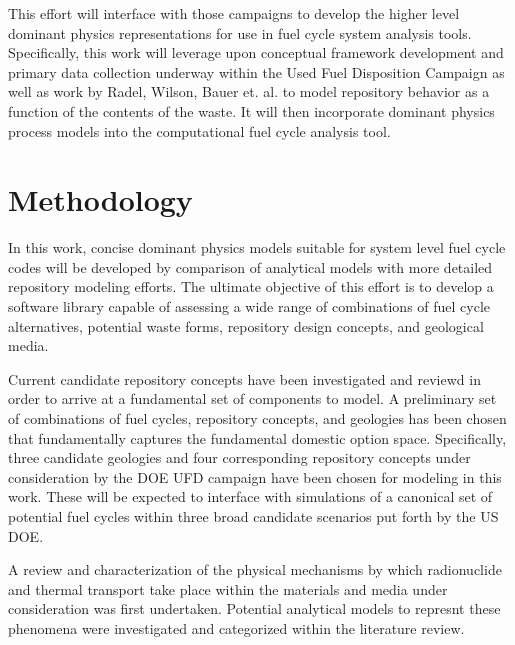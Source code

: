 This effort will interface with those campaigns to develop the higher level
dominant physics representations for use in fuel cycle system analysis tools.
Specifically, this work will leverage upon conceptual framework development and
primary data collection underway within the Used Fuel Disposition Campaign as
well as work by Radel, Wilson, Bauer et. al. to model repository behavior as a
function of the contents of the waste.  It will then incorporate dominant
physics process models into the \Cyclus computational fuel cycle analysis tool.




\section{Methodology} 


In this work, concise dominant physics models suitable for system level fuel 
cycle codes will be developed by comparison of analytical models with more 
detailed repository modeling efforts. The ultimate objective of this effort is 
to develop a software library capable of assessing a wide range of combinations 
of fuel cycle alternatives, potential waste forms, repository design concepts, 
and geological media. 


Current candidate repository concepts have been investigated and reviewd in 
order to arrive at a fundamental set of components to model. A preliminary set 
of combinations of fuel cycles, repository concepts, and geologies has been 
chosen that fundamentally captures the fundamental domestic option space. 
Specifically, three candidate geologies and four corresponding repository 
concepts under consideration by the \gls{DOE} \gls{UFD} campaign have been 
chosen for modeling in this work. These will be expected to interface
with \Cyclus simulations of a canonical set of potential fuel cycles within 
three broad candidate scenarios put forth by the \gls{US} \gls{DOE}.



A review and characterization of the physical mechanisms by which radionuclide 
and thermal transport take place within the materials and media under 
consideration was first undertaken. Potential analytical models to represnt  
these phenomena were investigated and categorized within the literature review. 

